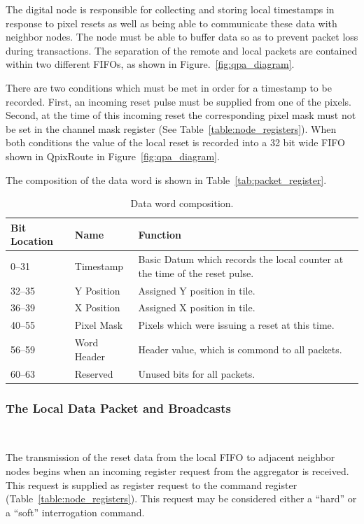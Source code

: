 The digital node is responsible for collecting and storing local timestamps in response to pixel resets as well as being able to communicate these data with neighbor nodes.
The node must be able to buffer data so as to prevent packet loss during transactions.
The separation of the remote and local packets are contained within two different FIFOs, as shown in Figure.~\ref{fig:qpa_diagram}.

There are two conditions which must be met in order for a timestamp to be recorded.
First, an incoming reset pulse must be supplied from one of the pixels.
Second, at the time of this incoming reset the corresponding pixel mask must not be set in the channel mask register (See Table~\ref{table:node_registers}).
When both conditions the value of the local reset is recorded into a 32 bit wide FIFO shown in QpixRoute in Figure~\ref{fig:qpa_diagram}.

The composition of the data word is shown in Table~\ref{tab:packet_register}.
\begin{table}
\begin{center}
\begin{tabular}{|| p{30mm} | p{30mm} | p{90mm} ||}
 \hline
 Bit Location & Name & Function \\ [0.5ex]
 \hline\hline
  0--31 & Timestamp & Basic Datum which records the local counter at the time of the reset pulse. \\
 \hline
  32--35 & Y Position & Assigned Y position in tile. \\
 \hline
  36--39 & X Position & Assigned X position in tile. \\
 \hline
  40--55 & Pixel Mask & Pixels which were issuing a reset at this time. \\
 \hline
  56--59 & Word Header & Header value, which is commond to all packets. \\
 \hline
  60--63 & Reserved & Unused bits for all packets. \\
 \hline
\end{tabular}
\caption{Data word composition.}
\label{tab:packet_data}
\end{center}
\end{table}

\subsubsection{The Local Data Packet and Broadcasts}~\label{sec:local_data_packet}

The transmission of the reset data from the local FIFO to adjacent neighbor nodes begins when an incoming register request from the aggregator is received.
This request is supplied as register request to the command register (Table~\ref{table:node_registers}).
This request may be considered either a ``hard'' or a ``soft'' interrogation command.

